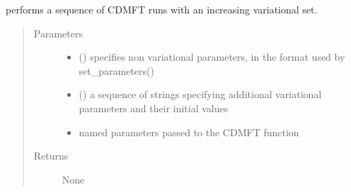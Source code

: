 \documentclass[letterpaper,10pt,english]{sphinxmanual}
\begin{document}

\begin{fulllineitems}
\label{\detokenize{cdmft:pyqcm.cdmft.cdmft_variational_sequence}}
\sphinxAtStartPar
performs a sequence of CDMFT runs with an increasing variational set.
\begin{quote}\begin{description}
\item[{Parameters}] \leavevmode\begin{itemize}
\item {} 
\sphinxAtStartPar
{} () \textendash{} specifies non variational parameters, in the format used by set\_parameters()

\item {} 
\sphinxAtStartPar
{} (\sphinxstyleliteralemphasis{\sphinxupquote{{[}}}\sphinxstyleliteralemphasis{\sphinxupquote{{]}}}) \textendash{} a sequence of strings specifying additional variational parameters and their initial values

\item {} 
\sphinxAtStartPar
{} \textendash{} named parameters passed to the CDMFT function

\end{itemize}

\item[{Returns}] \leavevmode
\sphinxAtStartPar
None

\end{description}\end{quote}

\end{fulllineitems}

\end{document}
